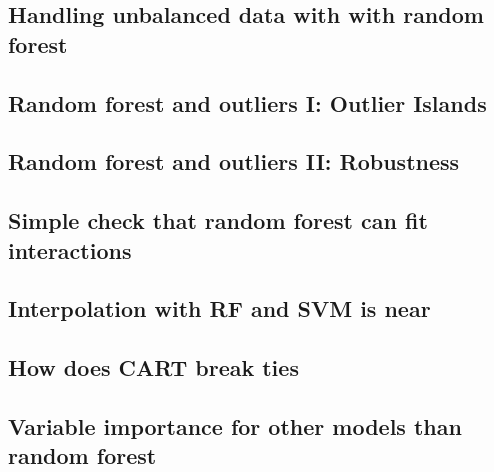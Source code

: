 \subsection{Handling unbalanced data with with random forest}
\label{CV1_classwt}



\subsection{Random forest and outliers I: Outlier Islands}

\label{CV2_fullygrown}

\subsection{Random forest and outliers II: Robustness}

\label{CV3_sensitiveOutliers}

\subsection{Simple check that random forest can fit interactions}

\label{CV4_assertInteraction}

\subsection{Interpolation with RF and SVM is near}

\label{CV5_SVM_RF_same_same}

\subsection{How does CART break ties}

\label{CV6_CARTtiebreak}

\subsection{Variable importance for other models than random forest}

\label{CV7_VIbeyondRF}

